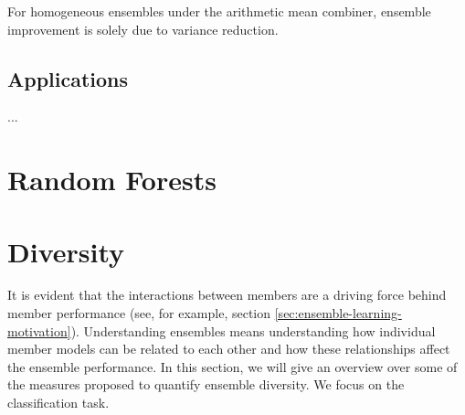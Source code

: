 \documentclass[
    a4paper, %
	fontsize=10pt, %
	twoside=false, %
]{kaobook}
\begin{document}
\begin{titlepage}
\begin{corollary}
For homogeneous ensembles under the arithmetic mean combiner, ensemble improvement is solely due to variance reduction.
\end{corollary}


\section{Applications}
...

\chapter{Random Forests}


\chapter{Diversity}







It is evident that the interactions between members are a driving force behind member performance (see, for example, section \ref{sec:ensemble-learning-motivation}). Understanding ensembles means understanding how individual member models can be related to each other and how these relationships affect the ensemble performance. In this section, we will give an overview over some of the measures proposed to quantify ensemble diversity. We focus on the classification task. 


\end{titlepage}
\end{document}
